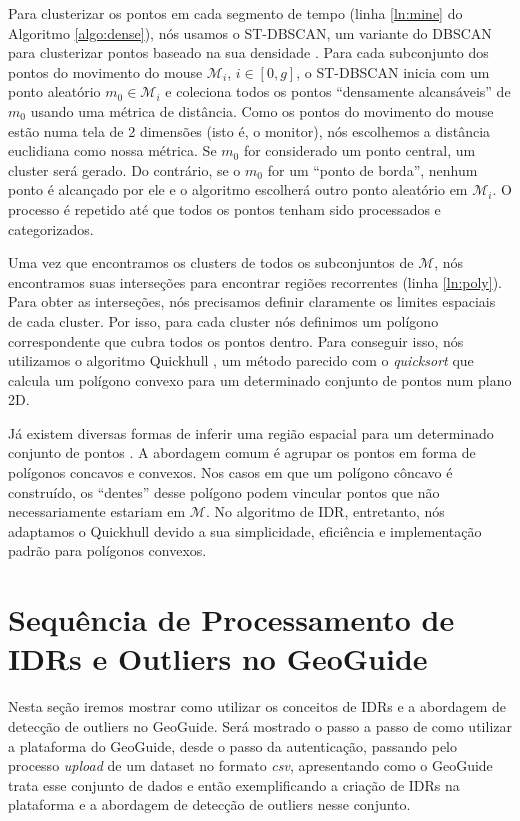 Para clusterizar os pontos em cada segmento de tempo (linha \ref{ln:mine} do Algoritmo \ref{algo:dense}), nós usamos o ST-DBSCAN, um variante do DBSCAN para clusterizar pontos baseado na sua densidade \cite{Birant:2007}. Para cada subconjunto dos pontos do movimento do mouse $\mathcal{M}_i$, $i \in [0,g]$, o ST-DBSCAN inicia com um ponto aleatório $m_0 \in \mathcal{M}_i$ e coleciona todos os pontos ``densamente alcansáveis'' de $m_0$ usando uma métrica de distância. Como os pontos do movimento do mouse estão numa tela de 2 dimensões (isto é, o monitor), nós escolhemos a distância euclidiana como nossa métrica. Se $m_0$ for considerado um ponto central,  um cluster será gerado. Do contrário, se o $m_0$ for um ``ponto de borda'', nenhum ponto é alcançado por ele e o algoritmo escolherá outro ponto aleatório em $\mathcal{M}_i$. O processo é repetido até que todos os pontos tenham sido processados e categorizados.

Uma vez que encontramos os clusters de todos os subconjuntos de $\mathcal{M}$, nós encontramos suas interseções para encontrar regiões recorrentes (linha \ref{ln:poly}). Para obter as interseções, nós precisamos definir claramente os limites espaciais de cada cluster. Por isso, para cada cluster nós definimos um polígono correspondente que cubra todos os pontos dentro. Para conseguir isso, nós utilizamos o algoritmo Quickhull \cite{Barber:1996}, um método parecido com o \textit{quicksort} que calcula um polígono convexo para um determinado conjunto de pontos num plano 2D.

Já existem diversas formas de inferir uma região espacial para um determinado conjunto de pontos \cite{Bevis1989,DUCKHAM2008,FADILI2004,ARAMPATZIS2006,Galton2006}. A abordagem comum é agrupar os pontos em forma de polígonos concavos e convexos. Nos casos em que um polígono côncavo é construído, os ``dentes'' desse polígono podem vincular pontos que não necessariamente estariam em $\mathcal{M}$. No algoritmo de IDR, entretanto, nós adaptamos o Quickhull devido a sua simplicidade, eficiência e implementação padrão para polígonos convexos.

\section{Sequência de Processamento de IDRs e Outliers no GeoGuide}

Nesta seção iremos mostrar como utilizar os conceitos de IDRs e a abordagem de detecção de outliers no GeoGuide. Será mostrado o passo a passo de como utilizar a plataforma do GeoGuide, desde o passo da autenticação, passando pelo processo \textit{upload} de um dataset no formato \textit{csv}, apresentando como o GeoGuide trata esse conjunto de dados e então exemplificando a criação de IDRs na plataforma e a abordagem de detecção de outliers nesse conjunto.

